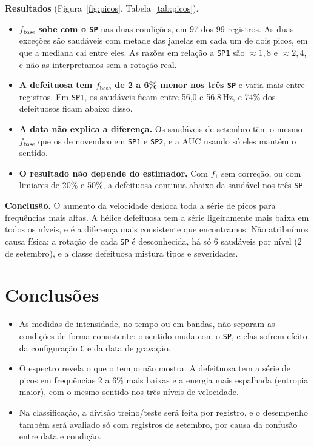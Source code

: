 \documentclass[10pt,a4paper]{article}
\newcommand{\cod}[1]{\texttt{#1}}
\begin{document}
\textbf{Resultados} (Figura~\ref{fig:picos}, Tabela~\ref{tab:picos}).
\begin{itemize}
  \item \textbf{$f_\text{base}$ sobe com o \cod{SP}} nas duas condições, em 97 dos 99 registros. As duas exceções são saudáveis com metade das janelas em cada um de dois picos, em que a mediana cai entre eles. As razões em relação a \cod{SP1} são $\approx 1{,}8$ e $\approx 2{,}4$, e não as interpretamos sem a rotação real.
  \item \textbf{A defeituosa tem $f_\text{base}$ de 2 a 6\% menor nos três \cod{SP}} e varia mais entre registros. Em \cod{SP1}, os saudáveis ficam entre 56,0 e 56,8\,Hz, e 74\% dos defeituosos ficam abaixo disso.
  \item \textbf{A data não explica a diferença.} Os saudáveis de setembro têm o mesmo $f_\text{base}$ que os de novembro em \cod{SP1} e \cod{SP2}, e a AUC usando só eles mantém o sentido.
  \item \textbf{O resultado não depende do estimador.} Com $f_1$ sem correção, ou com limiares de 20\% e 50\%, a defeituosa continua abaixo da saudável nos três \cod{SP}.
\end{itemize}

\textbf{Conclusão.} O aumento da velocidade desloca toda a série de picos para frequências mais altas.
A hélice defeituosa tem a série ligeiramente mais baixa em todos os níveis, e é a diferença mais consistente que encontramos.
Não atribuímos causa física: a rotação de cada \cod{SP} é desconhecida, há só 6 saudáveis por nível (2 de setembro), e a classe defeituosa mistura tipos e severidades.

\section{Conclusões}

\begin{itemize}
  \item As medidas de intensidade, no tempo ou em bandas, não separam as condições de forma consistente: o sentido muda com o \cod{SP}, e elas sofrem efeito da configuração \cod{C} e da data de gravação.
  \item O espectro revela o que o tempo não mostra. A defeituosa tem a série de picos em frequências 2 a 6\% mais baixas e a energia mais espalhada (entropia maior), com o mesmo sentido nos três níveis de velocidade.
  \item Na classificação, a divisão treino/teste será feita por registro, e o desempenho também será avaliado só com registros de setembro, por causa da confusão entre data e condição.
\end{itemize}
\end{document}

